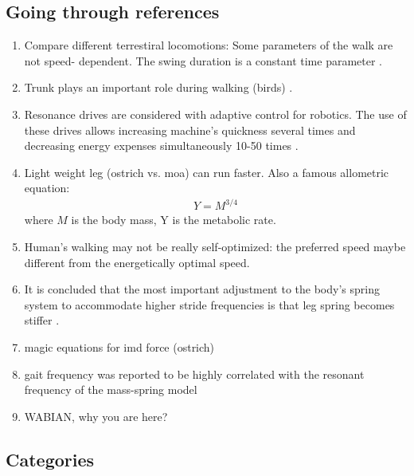 \documentclass{article}
\begin{document}
\subsection{Going through references}
\begin{enumerate}
\item Compare different terrestiral locomotions: Some parameters of the walk are not speed- dependent. The swing duration is a constant time parameter \cite{Abourachid2001}.
\item Trunk plays an important role during walking (birds) \cite{Abourachid2011}.
\item Resonance drives are considered with adaptive control for robotics. The use of these drives allows increasing machine's quickness several times and decreasing energy expenses simultaneously 10-50 times \cite{Akinfiev1999}.
\item Light weight leg (ostrich vs. moa) can run faster\cite{Alexander1985}. Also a famous allometric equation:
\begin{align}
Y = M^{3/4}
\end{align}
where $M$ is the body mass, Y is the metabolic rate.
\item Human's walking may not be really self-optimized: the preferred speed maybe different from the energetically optimal speed\cite{Buchli2006}.
\item It is concluded that the most important adjustment to the body’s spring system to accommodate higher stride frequencies is that leg spring becomes stiffer \cite{Farley1996}.
\item magic equations for imd force (ostrich) \cite{Jindrich2007}
\item gait frequency was reported to be highly correlated with the resonant frequency of the mass-spring model \cite{Lee2013}
\item WABIAN, why you are here? \cite{Lim2008}
\end{enumerate}
\subsection{Categories}
\end{document}
